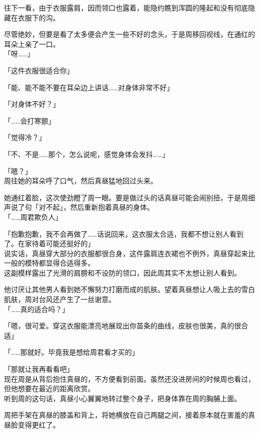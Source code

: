 往下一看，由于衣服露肩，因而领口也露着，能隐约瞧到浑圆的隆起和没有彻底隐藏在衣服下的沟。

尽管绝妙，但要是看了太多便会产生一些不好的念头，于是周移回视线，在通红的耳朵上亲了一口。\\

「呀……」

「这件衣服很适合你」

「能、能不能不要在耳朵边上讲话……对身体非常不好」

「对身体不好？」

「……会打寒颤」

「觉得冷？」

「不、不是……那个，怎么说呢，感觉身体会发抖……」

「嗯？」\\

周往她的耳朵呼了口气，然后真昼猛地回过头来。

她通红着脸，这次使劲瞪了周一眼。要是做过头的话真昼可能会闹别扭，于是周细声说了句「对不起」，然后重新抱着真昼的身体。\\

「……周君欺负人」

「抱歉抱歉，我不会再做了……话说回来，这衣服太合适，我都不想让别人看到了。在家待着可能还挺好的」\\

说实话，真昼穿大部分的衣服都很合身，这件露肩连衣裙也不例外，真昼穿起来比一般的模特都显得合适得多。\\

这副模样露出了光滑的肩膀和不设防的领口，因此周其实不太想让别人看到。

他讨厌让其他男人看到她不懈努力打磨而成的肌肤。望着真昼想让人吸上去的雪白肌肤，周对台风还产生了一丝谢意。\\

「……真的适合吗？」

「嗯，很可爱。穿这衣服能漂亮地展现出你苗条的曲线，皮肤也很美，真的很合适」

「……那就好。毕竟我是想给周君看才买的」

「那就让我再看看吧」\\

现在周是从背后抱住真昼的，不方便看到前面。虽然还没进房间的时候周也看过，但他想要在最近的距离欣赏。\\

听到周的这句话，真昼小心翼翼地转过整个身子，把身体靠在周的胸脯上面。

周把手架在真昼的膝盖和背上，将她横放在自己两腿之间，接着原本就在害羞的真昼脸变得更红了。\\

